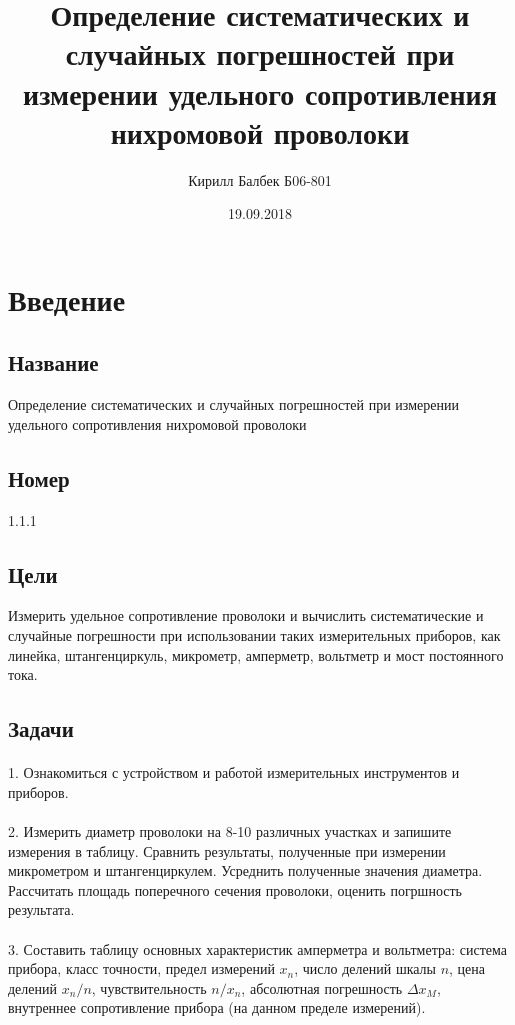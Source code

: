 \documentclass[14pt, a4paper]{scrartcl}
\title{Определение систематических и случайных погрешностей при измерении удельного сопротивления нихромовой проволоки}
\author{Кирилл Балбек Б06-801}
\date{19.09.2018}
\begin{document}
\maketitle

\section{Введение}
\subsection{Название}
Определение систематических и случайных погрешностей при измерении удельного сопротивления нихромовой проволоки
\subsection{Номер}
1.1.1
\subsection{Цели}
Измерить удельное сопротивление проволоки и вычислить систематические и случайные погрешности при использовании таких измерительных приборов, как линейка, штангенциркуль, микрометр, амперметр, вольтметр и мост постоянного тока.
\subsection{Задачи}
\paragraph{}
1. Ознакомиться с устройством и работой измерительных инструментов и приборов.
\paragraph{}
2. Измерить диаметр проволоки на 8-10 различных участках и запишите измерения в таблицу. Сравнить результаты, полученные при измерении микрометром и штангенциркулем. Усреднить полученные значения диаметра. Рассчитать площадь поперечного сечения проволоки, оценить погршность результата.
\paragraph{}
3. Составить таблицу основных характеристик амперметра и вольтметра: система прибора, класс точности, предел измерений $x_n$, число делений шкалы $n$, цена делений $x_n/n$, чувствительность $n/x_n$, абсолютная погрешность $\Delta x_M$, внутреннее сопротивление прибора (на данном пределе измерений).
\end{document}
